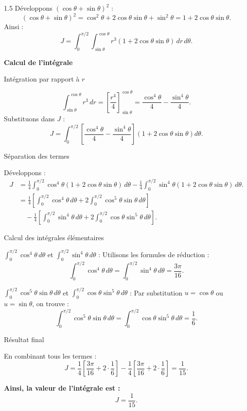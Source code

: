 \documentclass[12pt]{article}
\begin{document}
\begin{spacing}{1.5}
Développons \((\cos\theta + \sin\theta)^2\) :
\[
    (\cos\theta + \sin\theta)^2 = \cos^2\theta + 2\cos\theta\sin\theta + \sin^2\theta = 1 + 2\cos\theta\sin\theta.
\]
Ainsi :
\[
    J = \int_0^{\pi/2} \int_{\sin\theta}^{\cos\theta} r^3 \left(1 + 2\cos\theta\sin\theta\right) \, dr \, d\theta.
\]

\textbf{Calcul de l'intégrale}

 Intégration par rapport à \(r\)
 
\[
    \int_{\sin\theta}^{\cos\theta} r^3 \, dr = \left[ \frac{r^4}{4} \right]_{\sin\theta}^{\cos\theta} = \frac{\cos^4\theta}{4} - \frac{\sin^4\theta}{4}.
\]
Substituons dans \(J\) :
\[
    J = \int_0^{\pi/2} \left[ \frac{\cos^4\theta}{4} - \frac{\sin^4\theta}{4} \right] \left(1 + 2\cos\theta\sin\theta\right) d\theta.
\]

 Séparation des termes
 
Développons :
\begin{align*}
    J &= \frac{1}{4} \int_0^{\pi/2} \cos^4\theta (1 + 2\cos\theta\sin\theta) \, d\theta - \frac{1}{4} \int_0^{\pi/2} \sin^4\theta (1 + 2\cos\theta\sin\theta) \, d\theta. \\
    &= \frac{1}{4} \left[ \int_0^{\pi/2} \cos^4\theta \, d\theta + 2 \int_0^{\pi/2} \cos^5\theta\sin\theta \, d\theta \right] \\
    &\quad - \frac{1}{4} \left[ \int_0^{\pi/2} \sin^4\theta \, d\theta + 2 \int_0^{\pi/2} \cos\theta\sin^5\theta \, d\theta \right].
\end{align*}

 Calcul des intégrales élémentaires
 
 \(\int_0^{\pi/2} \cos^4\theta \, d\theta\) et \(\int_0^{\pi/2} \sin^4\theta \, d\theta\) : Utilisons les formules de réduction :
\[
    \int_0^{\pi/2} \cos^4\theta \, d\theta = \int_0^{\pi/2} \sin^4\theta \, d\theta = \frac{3\pi}{16}.
\]

 \(\int_0^{\pi/2} \cos^5\theta\sin\theta \, d\theta\) et \(\int_0^{\pi/2} \cos\theta\sin^5\theta \, d\theta\) : Par substitution \(u = \cos\theta\) ou \(u = \sin\theta\), on trouve :
\[
    \int_0^{\pi/2} \cos^5\theta\sin\theta \, d\theta = \int_0^{\pi/2} \cos\theta\sin^5\theta \, d\theta = \frac{1}{6}.
\]

Résultat final

En combinant tous les termes :
\[
    J = \frac{1}{4} \left[ \frac{3\pi}{16} + 2 \cdot \frac{1}{6} \right] - \frac{1}{4} \left[ \frac{3\pi}{16} + 2 \cdot \frac{1}{6} \right] = \frac{1}{15}.
\]

\textbf{Ainsi, la valeur de l'intégrale est :}
\[
    J = \frac{1}{15}.
\]





\end{spacing}
\end{document}
